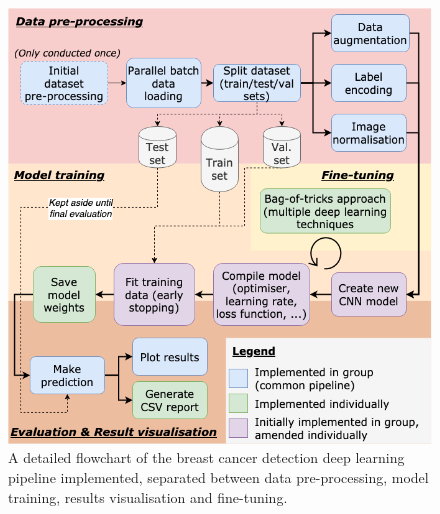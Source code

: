 \begin{figure}[h]
\centerline{\includegraphics[width=\textwidth]{figures/implementation/implementation flowchart.png}}
\caption{\label{fig:implementation-flowchart}A detailed flowchart of the breast cancer detection deep learning pipeline implemented, separated between data pre-processing, model training, results visualisation and fine-tuning.}
\end{figure}

